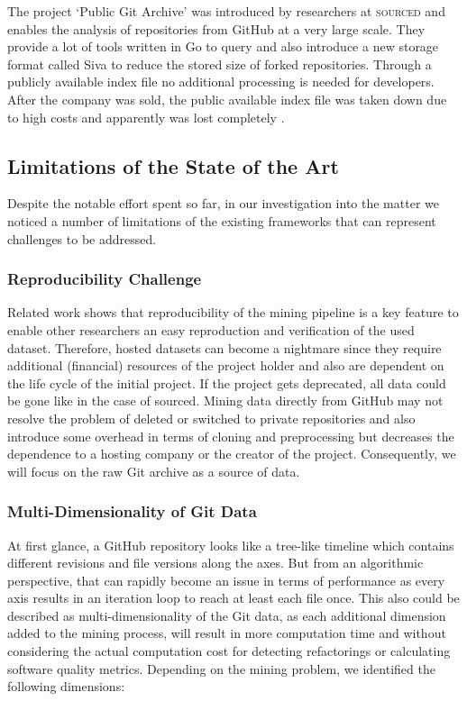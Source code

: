 The project `Public Git Archive' was introduced by researchers at \textsc{sourced} and enables the analysis of repositories from GitHub at a very large scale. They provide a lot of tools written in Go to query and also introduce a new storage format called Siva to reduce the stored size of forked repositories. Through a publicly available index file no additional processing is needed for developers. After the company was sold, the public available index file was taken down due to high costs and apparently was lost completely \cite{srcdissue}.

\subsection{Limitations of the State of the Art}
Despite the notable effort spent so far, in our investigation into the matter we noticed a number of limitations of the existing frameworks that can represent challenges to be addressed. 

\subsubsection{Reproducibility Challenge}
Related work shows that reproducibility of the mining pipeline is a key feature to enable other researchers an easy reproduction and verification of the used dataset. Therefore, hosted datasets can become a nightmare since they require additional (financial) resources of the project holder and also are dependent on the life cycle of the initial project. If the project gets deprecated, all data could be gone like in the case of sourced. Mining data directly from GitHub may not resolve the problem of deleted or switched to private repositories and also introduce some overhead in terms of cloning and preprocessing but decreases the dependence to a hosting company or the creator of the project. Consequently, we will focus on the raw Git archive as a source of data.

\subsubsection{Multi-Dimensionality of Git Data}
At first glance, a GitHub repository looks like a tree-like timeline which contains different revisions and file versions along the axes. But from an algorithmic perspective, that can rapidly become an issue in terms of performance as every axis results in an iteration loop to reach at least each file once. This also could be described as multi-dimensionality of the Git data, as each additional dimension added to the mining process, will result in more computation time and without considering the actual computation cost for detecting refactorings or calculating software quality metrics. Depending on the mining problem, we identified the following dimensions:

